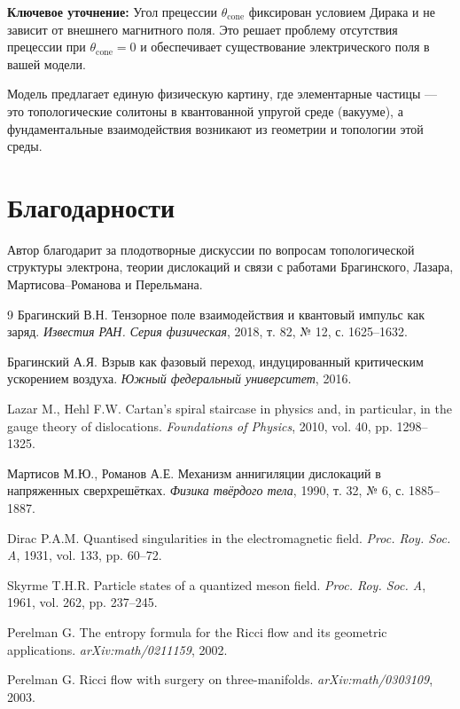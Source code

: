 \documentclass[12pt]{article}
\begin{document}
\textbf{Ключевое уточнение:} Угол прецессии $\theta_{\text{cone}}$ фиксирован условием Дирака и не зависит от внешнего магнитного поля. Это решает проблему отсутствия прецессии при $\theta_{\text{cone}} = 0$ и обеспечивает существование электрического поля в вашей модели.

Модель предлагает единую физическую картину, где элементарные частицы — это топологические солитоны в квантованной упругой среде (вакууме), а фундаментальные взаимодействия возникают из геометрии и топологии этой среды.

\section*{Благодарности}

Автор благодарит за плодотворные дискуссии по вопросам топологической структуры электрона, теории дислокаций и связи с работами Брагинского, Лазара, Мартисова–Романова и Перельмана.

\begin{thebibliography}{9}
 Брагинский В.Н. Тензорное поле взаимодействия и квантовый импульс как заряд. \textit{Известия РАН. Серия физическая}, 2018, т. 82, № 12, с. 1625–1632.

 Брагинский А.Я. Взрыв как фазовый переход, индуцированный критическим ускорением воздуха. \textit{Южный федеральный университет}, 2016.

 Lazar M., Hehl F.W. Cartan's spiral staircase in physics and, in particular, in the gauge theory of dislocations. \textit{Foundations of Physics}, 2010, vol. 40, pp. 1298–1325.

 Мартисов М.Ю., Романов А.Е. Механизм аннигиляции дислокаций в напряженных сверхрешётках. \textit{Физика твёрдого тела}, 1990, т. 32, № 6, с. 1885–1887.

 Dirac P.A.M. Quantised singularities in the electromagnetic field. \textit{Proc. Roy. Soc. A}, 1931, vol. 133, pp. 60–72.

 Skyrme T.H.R. Particle states of a quantized meson field. \textit{Proc. Roy. Soc. A}, 1961, vol. 262, pp. 237–245.

 Perelman G. The entropy formula for the Ricci flow and its geometric applications. \textit{arXiv:math/0211159}, 2002.

 Perelman G. Ricci flow with surgery on three-manifolds. \textit{arXiv:math/0303109}, 2003.
\end{thebibliography}
\end{document}
